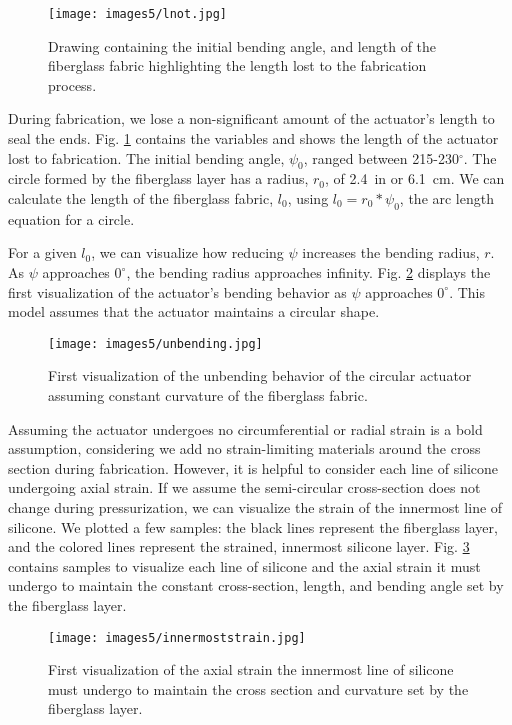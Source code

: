 \begin{figure}[ht]
    \centering
    \texttt{[image: images5/lnot.jpg]}
    \caption{Drawing containing the initial bending angle, and length of the fiberglass fabric highlighting the length lost to the fabrication process.}
    \label{fig:lnot}
\end{figure}

During fabrication, we lose a non-significant amount of the actuator's length to seal the ends. Fig. \ref{fig:lnot} contains the variables and shows the length of the actuator lost to fabrication. The initial bending angle, $\psi_{0}$, ranged between 215-230$^\circ$. The circle formed by the fiberglass layer has a radius, $r_{0}$, of 2.4~in or 6.1~cm. We can calculate the length of the fiberglass fabric, $l_{0}$, using $l_{0} = r_{0}*\psi_{0}$, the arc length equation for a circle. 

For a given $l_{0}$, we can visualize how reducing $\psi$ increases the bending radius, $r$. As $\psi$ approaches $0^\circ$, the bending radius approaches infinity. Fig. \ref{fig:unbending} displays the first visualization of the actuator's bending behavior as $\psi$ approaches $0^\circ$. This model assumes that the actuator maintains a circular shape. 
\\
\begin{figure}[ht]
    \centering
    \texttt{[image: images5/unbending.jpg]}
    \caption{First visualization of the unbending behavior of the circular actuator assuming constant curvature of the fiberglass fabric.}
    \label{fig:unbending}
\end{figure}

Assuming the actuator undergoes no circumferential or radial strain is a bold assumption, considering we add no strain-limiting materials around the cross section during fabrication. However, it is helpful to consider each line of silicone undergoing axial strain. If we assume the semi-circular cross-section does not change during pressurization, we can visualize the strain of the innermost line of silicone. We plotted a few samples: the black lines represent the fiberglass layer, and the colored lines represent the strained, innermost silicone layer. Fig. \ref{fig:innermoststrain} contains samples to visualize each line of silicone and the axial strain it must undergo to maintain the constant cross-section, length, and bending angle set by the fiberglass layer. 
\\
\begin{figure}[ht]
    \centering
    \texttt{[image: images5/innermoststrain.jpg]}
    \caption{First visualization of the axial strain the innermost line of silicone must undergo to maintain the cross section and curvature set by the fiberglass layer.}
    \label{fig:innermoststrain}
\end{figure}

